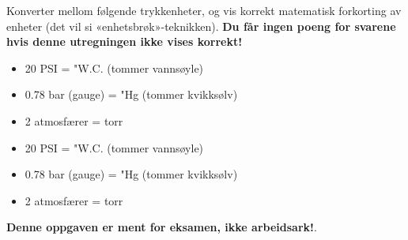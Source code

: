 
Konverter mellom følgende trykkenheter, og vis korrekt matematisk forkorting av enheter (det vil si «enhetsbrøk»-teknikken). {\bf Du får ingen poeng for svarene hvis denne utregningen ikke vises korrekt!}

\begin{itemize}
\item{} 20 PSI = \underbar{\hskip 50pt} "W.C. (tommer vannsøyle)
\item{} 0.78 bar (gauge) = \underbar{\hskip 50pt} "Hg (tommer kvikksølv)
\item{} 2 atmosfærer = \underbar{\hskip 50pt} torr
\end{itemize}







\begin{itemize}
\item{} 20 PSI =  "W.C. (tommer vannsøyle)
\item{} 0.78 bar (gauge) =  "Hg (tommer kvikksølv)
\item{} 2 atmosfærer =  torr
\end{itemize}







{\bf Denne oppgaven er ment for eksamen, ikke arbeidsark!}.

